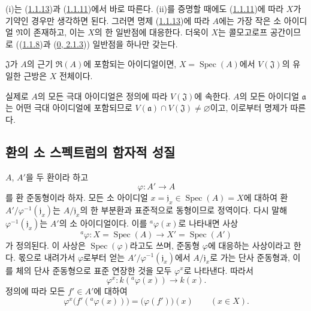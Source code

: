 (i)는 (\hyperref[I.1.1.13-ko]{1.1.13})과
(\hyperref[I.1.1.11-ko]{1.1.11})에서 바로 따른다. (ii)를
증명할 때에도 (\hyperref[I.1.1.11-ko]{1.1.11})에 따라 $X$가
기약인 경우만 생각하면 된다. 그러면 명제
(\hyperref[I.1.1.13-ko]{1.1.13})에 따라 $A$에는 가장 작은 소
아이디얼 $\mathfrak{N}$이 존재하고, 이는 $X$의 한 일반점에
대응한다.
더욱이 $X$는 콜모고로프 공간이므로
((\hyperref[I.1.1.8-ko]{1.1.8})과
(\hyperref[0.2.1.3-ko]{0, 2.1.3})) 일반점을 하나만 갖는다.

\begin{proposition}[1.1.15]
\label{I.1.1.15-ko}
$\mathfrak{J}$가 $A$의 근기 $\mathfrak{R}(A)$에 포함되는
아이디얼이면, $X=\operatorname{Spec}(A)$에서
$V(\mathfrak{J})$의 유일한 근방은 $X$ 전체이다.
\end{proposition}

실제로 $A$의 모든 극대 아이디얼은 정의에 따라
$V(\mathfrak{J})$에 속한다. $A$의 모든 아이디얼
$\mathfrak{a}$는 어떤 극대 아이디얼에 포함되므로
$V(\mathfrak{a})\cap V(\mathfrak{J})\neq\varnothing$이고,
이로부터 명제가 따른다.

\subsection{환의 소 스펙트럼의 함자적 성질}
\label{subsection:I.1.2-ko}

\begin{env}[1.2.1]
\label{I.1.2.1-ko}
$A$, $A'$을 두 환이라 하고
\[
  \varphi:A'\longrightarrow A
\]
를 환 준동형이라 하자. 모든 소 아이디얼
$x=\mathfrak{j}_x\in\operatorname{Spec}(A)=X$에 대하여 환
$A'/\varphi^{-1}(\mathfrak{j}_x)$는
$A/\mathfrak{j}_x$의 한 부분환과 표준적으로 동형이므로 정역이다.
다시 말해 $\varphi^{-1}(\mathfrak{j}_x)$는 $A'$의 소 아이디얼이다.
이를 ${}^a\varphi(x)$로 나타내면 사상
\[
  {}^a\varphi:X=\operatorname{Spec}(A)\longrightarrow
  X'=\operatorname{Spec}(A')
\]
가 정의된다. 이 사상은 $\operatorname{Spec}(\varphi)$라고도 쓰며,
준동형 $\varphi$에 대응하는 사상이라고 한다. 몫으로 내려가서
$\varphi$로부터 얻는
$A'/\varphi^{-1}(\mathfrak{j}_x)$에서
$A/\mathfrak{j}_x$로 가는 단사 준동형과, 이를 체의 단사 준동형으로
표준 연장한 것을 모두 $\varphi^x$로 나타낸다. 따라서
\[
  \varphi^x:k({}^a\varphi(x))\longrightarrow k(x).
\]
정의에 따라 모든 $f'\in A'$에 대하여
\begin{equation}
  \varphi^x\bigl(f'({}^a\varphi(x))\bigr)=\bigl(\varphi(f')\bigr)(x)
  \qquad(x\in X).
  \tag{1.2.1.1}\label{I.1.2.1.1-ko}
\end{equation}
\end{env}


